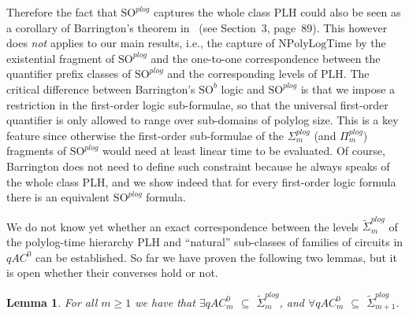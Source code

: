 \documentclass{article}
\newtheorem{lemma}{Lemma}
\newcommand{\npolylog}{\mathrm{NPolyLogTime}}
\begin{document}
Therefore the fact that $\mathrm{SO}^{\mathit{plog}}$ captures the whole class $\mathrm{PLH}$ could also be seen as a corollary of Barrington's theorem in~\cite{Barr92} (see Section~3, page~89). This however does \emph{not} applies to our main results, i.e., the capture of $\npolylog$ by the existential fragment of $\mathrm{SO}^{\mathit{plog}}$ and the one-to-one correspondence between the quantifier prefix classes of $\mathrm{SO}^{\mathit{plog}}$ and the corresponding levels of $\mathrm{PLH}$. The critical difference between Barrington's $\mathrm{SO}^b$ logic and $\mathrm{SO}^{\mathit{plog}}$ is that we impose a restriction in the first-order logic sub-formulae, so that the universal first-order quantifier is only allowed to range over sub-domains of polylog size. This is a key feature since otherwise the first-order sub-formulae of the $\Sigma^{\mathit{plog}}_m$ (and $\Pi^{\mathit{plog}}_m$) fragments of $\mathrm{SO}^{\mathit{plog}}$ would need at least linear time to be evaluated. Of course, Barrington does not need to define such constraint because he always speaks of the whole class $\mathrm{PLH}$, and we show indeed that for every first-order logic formula there is an equivalent $\mathrm{SO}^{\mathit{plog}}$ formula. 

We do not know yet whether an exact correspondence between the levels $\tilde{\Sigma}_m^{\mathit{plog}}$ of the polylog-time hierarchy PLH and ``natural'' sub-classes of families of circuits in $\mathit{qAC}^0$ can be established. So far we have proven the following two lemmas, but it is open whether their converses hold or not.



\begin{lemma}\label{a}
For all $m \ge 1$ we have that $\exists qAC^0_{m}$ $\subseteq$ $\tilde{\Sigma}^{\mathit{plog}}_m$, and $\forall qAC^0_{m}$ $\subseteq$ $\tilde{\Sigma}^{\mathit{plog}}_{m+1}$.



\end{lemma}
\end{document}
